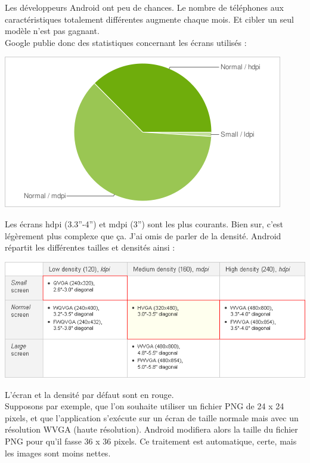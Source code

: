 \documentclass[a4paper]{report}
\begin{document}
		Les développeurs Android ont peu de chances. Le nombre de téléphones aux caractéristiques totalement différentes augmente chaque mois. Et cibler un seul modèle n’est pas gagnant.\\
		Google publie donc des statistiques concernant les écrans utilisés :\\
		\begin{center}
			\includegraphics[scale=0.9]{Images/stats-screens-density.png}
		\end{center}
		Les écrans hdpi (3.3”-4”) et mdpi (3”) sont les plus courants. Bien sur, c’est légèrement plus complexe que ça. J’ai omis de parler de la densité. Android répartit les différentes 			tailles et densités ainsi :
		\begin{center}
			\includegraphics[scale=0.7]{Images/resolution-android.png}
		\end{center}
		L’écran et la densité par défaut sont en rouge.\\

		Supposons par exemple, que l’on souhaite utiliser un fichier PNG de 24 x 24 pixels, et que l’application s’exécute sur un écran de taille normale mais avec un résolution WVGA (haute 			résolution). Android modifiera alors la taille du fichier PNG pour qu’il fasse 36 x 36 pixels. Ce traitement est automatique, certe, mais les images sont moins nettes.\\
\end{document}
